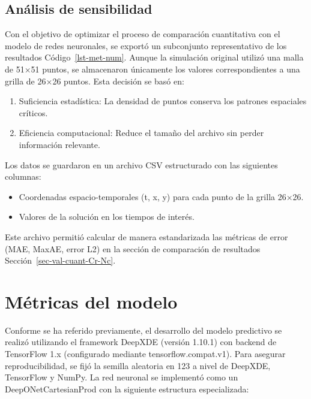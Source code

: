 \documentclass[
  spanish,
  us-letterpaper,
]{scrreprt}
\providecommand{\tightlist}{%
  \setlength{\itemsep}{0pt}\setlength{\parskip}{0pt}}
\theoremstyle{definition}
\theoremstyle{plain}
\theoremstyle{remark}
\begin{document}
\section{Análisis de sensibilidad}\label{anuxe1lisis-de-sensibilidad}

Con el objetivo de optimizar el proceso de comparación cuantitativa con
el modelo de redes neuronales, se exportó un subconjunto representativo
de los resultados Código~\ref{lst-met-num}. Aunque la simulación
original utilizó una malla de 51×51 puntos, se almacenaron únicamente
los valores correspondientes a una grilla de 26×26 puntos. Esta decisión
se basó en:

\begin{enumerate}
\def\labelenumi{\arabic{enumi}.}
\tightlist
\item
  Suficiencia estadística: La densidad de puntos conserva los patrones
  espaciales críticos.
\item
  Eficiencia computacional: Reduce el tamaño del archivo sin perder
  información relevante.
\end{enumerate}

Los datos se guardaron en un archivo CSV estructurado con las siguientes
columnas:

\begin{itemize}
\tightlist
\item
  Coordenadas espacio-temporales (t, x, y) para cada punto de la grilla
  26×26.
\item
  Valores de la solución en los tiempos de interés.
\end{itemize}

Este archivo permitió calcular de manera estandarizada las métricas de
error (MAE, MaxAE, error L2) en la sección de comparación de resultados
Sección~\ref{sec-val-cuant-Cr-Nc}.

\chapter{Métricas del modelo}\label{muxe9tricas-del-modelo}

Conforme se ha referido previamente, el desarrollo del modelo predictivo
se realizó utilizando el framework DeepXDE (versión 1.10.1) con backend
de TensorFlow 1.x (configurado mediante tensorflow.compat.v1). Para
asegurar reproducibilidad, se fijó la semilla aleatoria en 123 a nivel
de DeepXDE, TensorFlow y NumPy. La red neuronal se implementó como un
DeepONetCartesianProd con la siguiente estructura especializada:
\end{document}
